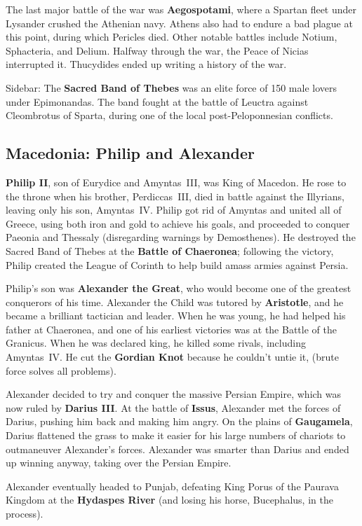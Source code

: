 The last major battle of the war was \textbf{Aegospotami},
where a Spartan fleet under Lysander crushed the Athenian navy.
Athens also had to endure a bad plague at this point, during which Pericles died.
Other notable battles include Notium, Sphacteria, and Delium.
Halfway through the war, the Peace of Nicias interrupted it.
Thucydides ended up writing a history of the war.

Sidebar: The \textbf{Sacred Band of Thebes} was an elite force of 150 male lovers under Epimonandas.
The band fought at the battle of Leuctra against Cleombrotus of Sparta,
during one of the local post-Peloponnesian conflicts.

\subsection*{Macedonia: Philip and Alexander}

\textbf{Philip II}, son of Eurydice and Amyntas~III, was King of Macedon.
He rose to the throne when his brother, Perdiccas~III,
died in battle against the Illyrians, leaving only his son, Amyntas~IV\@.
Philip got rid of Amyntas and united all of Greece,
using both iron and gold to achieve his goals,
and proceeded to conquer Paeonia and Thessaly (disregarding warnings by Demosthenes).
He destroyed the Sacred Band of Thebes at the \textbf{Battle of Chaeronea};
following the victory,
Philip created the League of Corinth to help build amass armies against Persia.

Philip's son was \textbf{Alexander the Great}, who would become one of the greatest conquerors of his time.
Alexander the Child was tutored by \textbf{Aristotle}, and he became a brilliant tactician and leader.
When he was young, he had helped his father at Chaeronea,
and one of his earliest victories was at the Battle of the Granicus.
When he was declared king, he killed some rivals, including Amyntas~IV\@.
He cut the \textbf{Gordian Knot} because he couldn't untie it,
(brute force solves all problems).

Alexander decided to try and conquer the massive Persian Empire,
which was now ruled by \textbf{Darius III}\@.
At the battle of \textbf{Issus},
Alexander met the forces of Darius, pushing him back and making him angry.
On the plains of \textbf{Gaugamela},
Darius flattened the grass to make it easier for his large numbers of chariots
to outmaneuver Alexander's forces.
Alexander was smarter than Darius and ended up winning anyway, taking over the Persian Empire.

Alexander eventually headed to Punjab,
defeating King Porus of the Paurava Kingdom at the \textbf{Hydaspes River}
(and losing his horse, Bucephalus, in the process).

